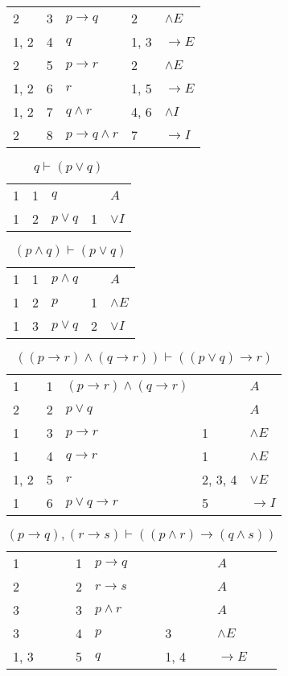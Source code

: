 \documentclass{article}
\begin{document}
\begin{table}[htbp]
\begin{tabular}{lrlll}
{2} & 3 & $p→q$ & {2} & $∧E$ \\
{1, 2} & 4 & $q$ & {1, 3} & $→E$ \\
{2} & 5 & $p→r$ & {2} & $∧E$ \\
{1, 2} & 6 & $r$ & {1, 5} & $→E$ \\
{1, 2} & 7 & $q∧r$ & {4, 6} & $∧I$ \\
{2} & 8 & $p→q∧r$ & {7} & $→I$ \\
\end{tabular}
\end{table}\begin{table}[htbp]\caption*{$q ⊢ (p∨q)$}\centering\begin{tabular}{lrlll}
{1} & 1 & $q$ & {} & $A$ \\
{1} & 2 & $p∨q$ & {1} & $∨I$ \\
\end{tabular}
\end{table}\begin{table}[htbp]\caption*{$(p∧q) ⊢ (p∨q)$}\centering\begin{tabular}{lrlll}
{1} & 1 & $p∧q$ & {} & $A$ \\
{1} & 2 & $p$ & {1} & $∧E$ \\
{1} & 3 & $p∨q$ & {2} & $∨I$ \\
\end{tabular}
\end{table}\begin{table}[htbp]\caption*{$((p→r)∧(q→r)) ⊢ ((p∨q)→r)$}\centering\begin{tabular}{lrlll}
{1} & 1 & $(p→r)∧(q→r)$ & {} & $A$ \\
{2} & 2 & $p∨q$ & {} & $A$ \\
{1} & 3 & $p→r$ & {1} & $∧E$ \\
{1} & 4 & $q→r$ & {1} & $∧E$ \\
{1, 2} & 5 & $r$ & {2, 3, 4} & $∨E$ \\
{1} & 6 & $p∨q→r$ & {5} & $→I$ \\
\end{tabular}
\end{table}\begin{table}[htbp]\caption*{$(p→q),(r→s) ⊢ ((p∧r)→(q∧s))$}\centering\begin{tabular}{lrlll}
{1} & 1 & $p→q$ & {} & $A$ \\
{2} & 2 & $r→s$ & {} & $A$ \\
{3} & 3 & $p∧r$ & {} & $A$ \\
{3} & 4 & $p$ & {3} & $∧E$ \\
{1, 3} & 5 & $q$ & {1, 4} & $→E$ \\

\end{tabular}
\end{table}
\end{document}
